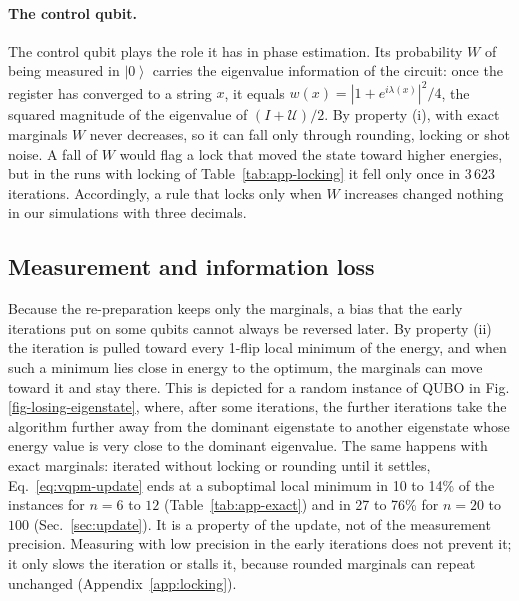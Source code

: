 \documentclass[onecolumn,10pt]{article}
\newcommand{\ket}[1]{\ensuremath{\left|#1\right\rangle}} %
\theoremstyle{remark}
\theoremstyle{plain}
\begin{document}
\paragraph{The control qubit.}
\label{sec:controlqubit}
The control qubit plays the role it has in phase estimation. Its probability $W$ of being measured in $\ket{0}$ carries the eigenvalue information of the circuit: once the register has converged to a string $x$, it equals $w(x)=|1+e^{i\lambda(x)}|^2/4$, the squared magnitude of the eigenvalue of $(I+\mathcal{U})/2$. By property (i), with exact marginals $W$ never decreases, so it can fall only through rounding, locking or shot noise. A fall of $W$ would flag a lock that moved the state toward higher energies, but in the runs with locking of Table~\ref{tab:app-locking} it fell only once in 3\,623 iterations. Accordingly, a rule that locks only when $W$ increases changed nothing in our simulations with three decimals.

\subsection{Measurement and information loss}
\label{sec:infoloss}
Because the re-preparation keeps only the marginals, a bias that the early iterations put on some qubits cannot always be reversed later. By property (ii) the iteration is pulled toward every 1-flip local minimum of the energy, and when such a minimum lies close in energy to the optimum, the marginals can move toward it and stay there. This is depicted for a random instance of QUBO in Fig.\ref{fig-losing-eigenstate}, where, after some iterations, the further iterations take the algorithm further away from the dominant eigenstate to another eigenstate whose energy value is very close to the dominant eigenvalue. The same happens with exact marginals: iterated without locking or rounding until it settles, Eq.~\eqref{eq:vqpm-update} ends at a suboptimal local minimum in 10 to 14\% of the instances for $n=6$ to $12$ (Table~\ref{tab:app-exact}) and in 27 to 76\% for $n=20$ to $100$ (Sec.~\ref{sec:update}). It is a property of the update, not of the measurement precision. Measuring with low precision in the early iterations does not prevent it; it only slows the iteration or stalls it, because rounded marginals can repeat unchanged (Appendix~\ref{app:locking}).
\end{document}
